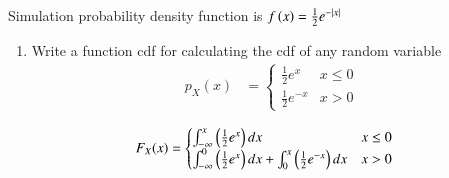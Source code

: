 \documentclass{beamer}
\begin{document}
\begin{frame}[allowframebreaks]{Simulation}
probability density function is $ f\left(x\right) = \frac{1}{2} e^{-|x|}$
\begin{enumerate}
\item Write a function cdf for calculating the cdf of any random variable\\
	 \begin{align}
  p_X(x) &= 
  \begin{cases}
          \frac{1}{2} e^{x} & x \le 0
  \\
          \frac{1}{2} e^{-x} &  x > 0
  \end{cases}
  \end{align}

  \begin{align}
  F_X(x) &= 
  \begin{cases}
	  \int_{-\infty}^{x} \left(\frac{1}{2} e^{x}\right) dx  & x \le 0
  \\
	  \int_{-\infty}^{0} \left(\frac{1}{2} e^{x}\right) dx + \int_{0}^{x} \left(\frac{1}{2} e^{-x}\right) dx &  x > 0
  \end{cases}
  \end{align}


\end{enumerate}
\end{frame}
\end{document}
